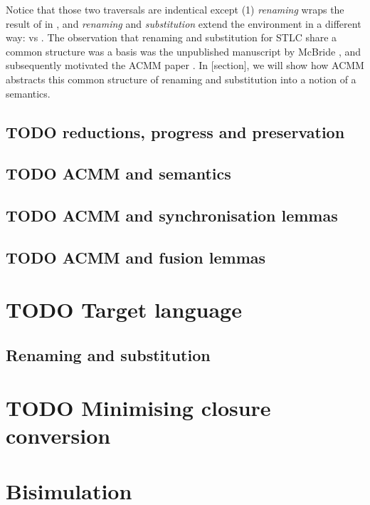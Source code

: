 \documentclass[bsc,frontabs,twoside,singlespacing,parskip,deptreport]{infthesis}
\theoremstyle{definition}
\begin{document}

Notice that those two traversals are indentical except (1)
\textit{renaming} wraps the result of  in , and
\textit{renaming} and \textit{substitution} extend the environment in
a different way:  vs . The observation that renaming and substitution for STLC share a
common structure was a basis was the unpublished manuscript by McBride
\cite{mcbride2005type}, and subsequently motivated the ACMM paper
\cite{DBLP:conf/cpp/Allais0MM17}. In [section], we will show how ACMM
abstracts this common structure of renaming and substitution into a
notion of a semantics.

\section{TODO reductions, progress and preservation}

\section{TODO ACMM and semantics}

\section{TODO ACMM and synchronisation lemmas}

\section{TODO ACMM and fusion lemmas}

\chapter{TODO Target language}

\section{Renaming and substitution}

\chapter{TODO Minimising closure conversion}

\chapter{Bisimulation}
\end{document}
